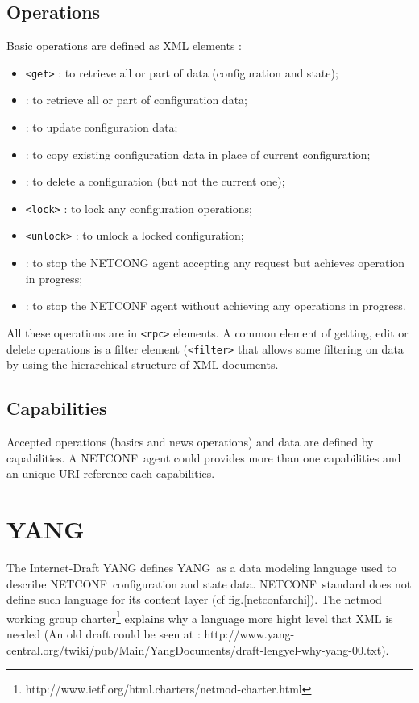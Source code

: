 \documentclass[a4paper]{article}
\newcommand{\nc}{NETCONF}
\newcommand{\y}{YANG}
\begin{document}
\subsection{Operations}

Basic operations are defined as XML elements :

\begin{itemize}
\item
{\tt <get>} : to retrieve all or part of data (configuration and state);
\item
{\tt <get-config>} : to retrieve all or part of configuration data;
\item
{\tt <edit-config>} : to update configuration data;
\item
{\tt <copy-config>} : to copy existing configuration data in place of
current configuration;
\item
{\tt <delete-config>} : to delete a configuration (but not the current one);
\item
{\tt <lock>} : to lock any configuration operations;
\item
{\tt <unlock>} : to unlock a locked configuration;
\item
{\tt  <close-session>}  : to  stop  the  NETCONG  agent accepting  any
request but achieves operation in progress;
\item
{\tt <kill-session>} : to stop  the NETCONF agent without achieving any
operations in progress.
\end{itemize}

All these operations are in  {\tt <rpc>} elements. A common element of
getting, edit or delete operations is a filter element ({\tt <filter>}
that allows some filtering on data by using the hierarchical structure
of XML documents.

\subsection{Capabilities}

Accepted operations (basics and  news operations) and data are defined
by  capabilities.   A  \nc\  agent   could  provides  more   than  one
capabilities and an unique URI reference each capabilities.


\section{\y}
\label{yang}

The  Internet-Draft \y\cite{yang01}  defines  \y\ as  a data  modeling
language  used to  describe \nc\  configuration and  state  data. \nc\
standard  does not  define such  language  for its  content layer  (cf
fig.\ref{netconfarchi}).       The      netmod      working      group
charter\footnote{http://www.ietf.org/html.charters/netmod-charter.html}
explains why  a language more hight  level that XML is  needed (An old
draft          could           be          seen          at          :
http://www.yang-central.org/twiki/pub/Main/Yang\-Do\-cu\-ments/draft-lengyel-why-yang-00.txt).
\end{document}
